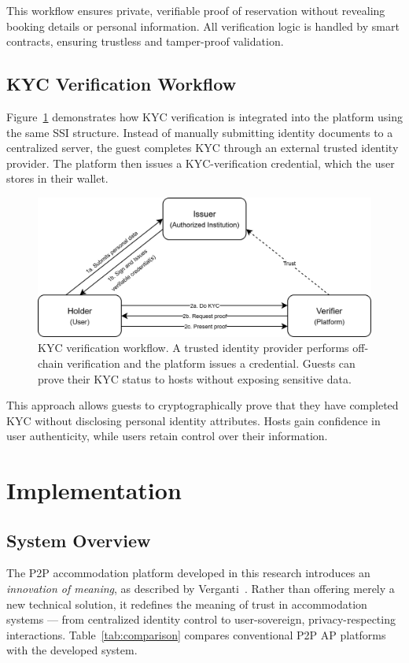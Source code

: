 \documentclass[conference]{IEEEtran}
\begin{document}
This workflow ensures private, verifiable proof of reservation without revealing booking details or personal information. All verification logic is handled by smart contracts, ensuring trustless and tamper-proof validation.

\subsection{KYC Verification Workflow}
Figure~\ref{fig:kyc_communication_diagram} demonstrates how KYC verification is integrated into the platform using the same SSI structure. Instead of manually submitting identity documents to a centralized server, the guest completes KYC through an external trusted identity provider. The platform then issues a KYC-verification credential, which the user stores in their wallet.

\begin{figure}[h!]
  \centering
  \includegraphics[width=0.99\linewidth]{communication-kyc.png} %
  \caption{KYC verification workflow. A trusted identity provider performs off-chain verification and the platform issues a credential. Guests can prove their KYC status to hosts without exposing sensitive data.}
  \label{fig:kyc_communication_diagram}
\end{figure}

This approach allows guests to cryptographically prove that they have completed KYC without disclosing personal identity attributes. Hosts gain confidence in user authenticity, while users retain control over their information.

\section{Implementation}
\label{sec:implementation}
\subsection{System Overview}
The P2P accommodation platform developed in this research introduces an \textit{innovation of meaning}, as described by Verganti~\cite{verganti2016}. Rather than offering merely a new technical solution, it redefines the meaning of trust in accommodation systems — from centralized identity control to user-sovereign, privacy-respecting interactions. Table~\ref{tab:comparison} compares conventional P2P AP platforms with the developed system.
\end{document}
